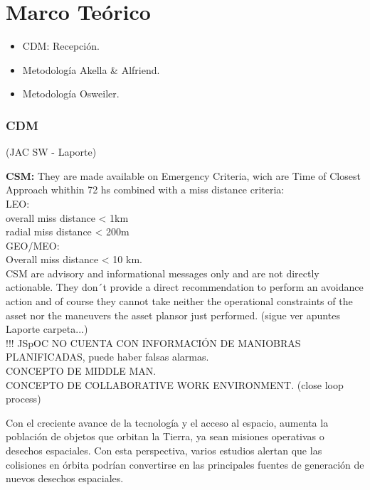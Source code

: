 \chapter{Marco Teórico}
\label{chap:marcoteorico}

\begin{itemize}
 \item CDM: Recepci\'on.
 \item Metodolog\'ia Akella \& Alfriend.
 \item Metodolog\'ia Osweiler.
\end{itemize}

\subsection{CDM}
(JAC SW - Laporte)

{\bf{CSM:}} They are made available on Emergency Criteria, wich are Time of Closest Approach whithin 72 hs combined with a miss distance criteria:\\
LEO:\\
overall miss distance < 1km\\
radial miss distance < 200m\\
GEO/MEO:\\
Overall miss distance < 10 km.\\

CSM are advisory and informational messages only and are not directly actionable. They don´t provide a direct recommendation to perform an avoidance action and of course they cannot take neither the operational constraints of the asset nor the maneuvers the asset plansor just performed. (sigue ver apuntes Laporte carpeta...)\\

!!! JSpOC NO CUENTA CON INFORMACI\'ON DE MANIOBRAS PLANIFICADAS, puede haber falsas alarmas.\\

CONCEPTO DE MIDDLE MAN.\\
CONCEPTO DE COLLABORATIVE WORK ENVIRONMENT. (close loop process)

Con el creciente avance de la tecnolog\'ia y el acceso al espacio, aumenta la poblaci\'on de objetos que orbitan la Tierra, ya sean  misiones operativas o desechos espaciales. Con esta perspectiva, varios estudios alertan que las colisiones en \'orbita podr\'ian convertirse en las principales fuentes de generaci\'on de nuevos desechos espaciales. \cite{KlinkradChapter8}\\

